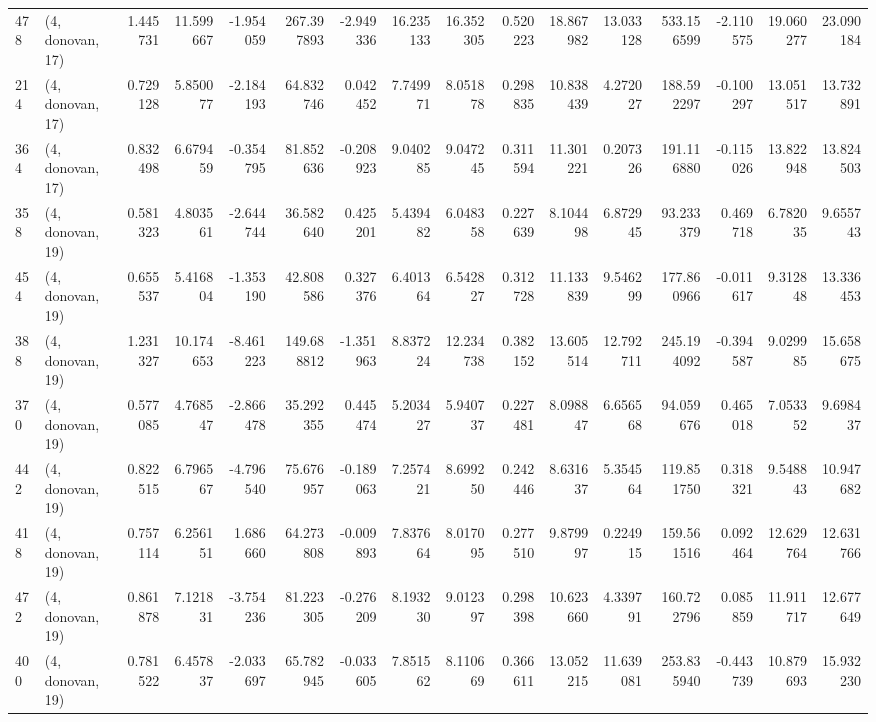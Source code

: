 \begin{tabular}{llrrrrrrrrrrrrrr}
478 &  (4, donovan, 17) &   1.445731 &  11.599667 &  -1.954059 &   267.397893 &  -2.949336 &  16.235133 &  16.352305 &  0.520223 &  18.867982 &  13.033128 &    533.156599 &   -2.110575 &   19.060277 &   23.090184 \\
214 &  (4, donovan, 17) &   0.729128 &   5.850077 &  -2.184193 &    64.832746 &   0.042452 &   7.749971 &   8.051878 &  0.298835 &  10.838439 &   4.272027 &    188.592297 &   -0.100297 &   13.051517 &   13.732891 \\
364 &  (4, donovan, 17) &   0.832498 &   6.679459 &  -0.354795 &    81.852636 &  -0.208923 &   9.040285 &   9.047245 &  0.311594 &  11.301221 &   0.207326 &    191.116880 &   -0.115026 &   13.822948 &   13.824503 \\
358 &  (4, donovan, 19) &   0.581323 &   4.803561 &  -2.644744 &    36.582640 &   0.425201 &   5.439482 &   6.048358 &  0.227639 &   8.104498 &   6.872945 &     93.233379 &    0.469718 &    6.782035 &    9.655743 \\
454 &  (4, donovan, 19) &   0.655537 &   5.416804 &  -1.353190 &    42.808586 &   0.327376 &   6.401364 &   6.542827 &  0.312728 &  11.133839 &   9.546299 &    177.860966 &   -0.011617 &    9.312848 &   13.336453 \\
388 &  (4, donovan, 19) &   1.231327 &  10.174653 &  -8.461223 &   149.688812 &  -1.351963 &   8.837224 &  12.234738 &  0.382152 &  13.605514 &  12.792711 &    245.194092 &   -0.394587 &    9.029985 &   15.658675 \\
370 &  (4, donovan, 19) &   0.577085 &   4.768547 &  -2.866478 &    35.292355 &   0.445474 &   5.203427 &   5.940737 &  0.227481 &   8.098847 &   6.656568 &     94.059676 &    0.465018 &    7.053352 &    9.698437 \\
442 &  (4, donovan, 19) &   0.822515 &   6.796567 &  -4.796540 &    75.676957 &  -0.189063 &   7.257421 &   8.699250 &  0.242446 &   8.631637 &   5.354564 &    119.851750 &    0.318321 &    9.548843 &   10.947682 \\
418 &  (4, donovan, 19) &   0.757114 &   6.256151 &   1.686660 &    64.273808 &  -0.009893 &   7.837664 &   8.017095 &  0.277510 &   9.879997 &   0.224915 &    159.561516 &    0.092464 &   12.629764 &   12.631766 \\
472 &  (4, donovan, 19) &   0.861878 &   7.121831 &  -3.754236 &    81.223305 &  -0.276209 &   8.193230 &   9.012397 &  0.298398 &  10.623660 &   4.339791 &    160.722796 &    0.085859 &   11.911717 &   12.677649 \\
400 &  (4, donovan, 19) &   0.781522 &   6.457837 &  -2.033697 &    65.782945 &  -0.033605 &   7.851562 &   8.110669 &  0.366611 &  13.052215 &  11.639081 &    253.835940 &   -0.443739 &   10.879693 &   15.932230 \\

\end{tabular}
